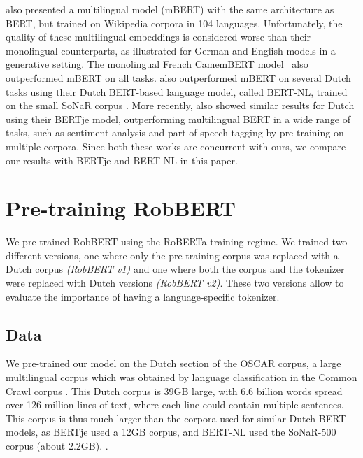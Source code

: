 \documentclass[11pt,a4paper]{article}
\begin{document}
\citet{devlinBERT2019a} also presented a multilingual model (mBERT) with the same architecture as BERT, but trained on Wikipedia corpora in 104 languages.
Unfortunately, the quality of these multilingual embeddings is considered worse than their monolingual counterparts, as
\citet{ronnqvistMultilingual2019} illustrated for German and English models in a generative setting.
The monolingual French CamemBERT model~\citep{martinCamemBERT2019} also outperformed mBERT on all tasks. 
\citet{brandsen2019bert} also outperformed mBERT on several Dutch tasks using their Dutch BERT-based language model, called BERT-NL, trained on the small SoNaR corpus \citep{oostdijk2013sonar}.
More recently, \citet{devriesBERTje2019} also showed similar results for Dutch using their BERTje model, outperforming multilingual BERT in a wide range of tasks, such as sentiment analysis and part-of-speech tagging by pre-training on multiple corpora.
Since both these works are concurrent with ours, we compare our results with BERTje and BERT-NL in this paper.






\section{Pre-training RobBERT}


We pre-trained RobBERT using the RoBERTa training regime.
We trained two different versions, one where only the pre-training corpus was replaced with a Dutch corpus \emph{(RobBERT v1)} and one where both the corpus and the tokenizer were replaced with Dutch versions \emph{(RobBERT v2)}.
These two versions allow to evaluate the importance of having a language-specific tokenizer.




\subsection{Data}

We pre-trained our model on the Dutch section of the OSCAR corpus, a large multilingual corpus which was obtained by language classification in the Common Crawl corpus \citep{ortizsuarezAsynchronous2019}.
This Dutch corpus is 39GB large, with 6.6 billion words spread over 126 million lines of text, where each line could contain multiple sentences.
This corpus is thus much larger than the corpora used for similar Dutch BERT models, as BERTje used a 12GB corpus, and BERT-NL used the SoNaR-500 corpus (about 2.2GB). \citep{devriesBERTje2019,brandsen2019bert}.
\end{document}
